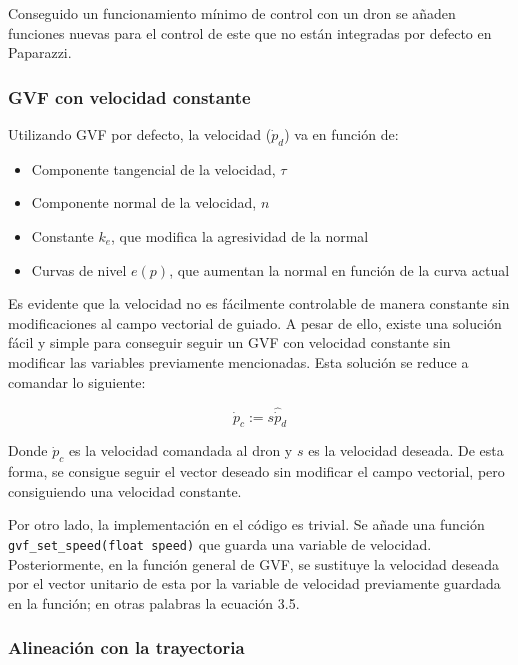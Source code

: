 Conseguido un funcionamiento mínimo de control con un dron se añaden 
funciones nuevas para el control de este que no están integradas por defecto en Paparazzi.

\subsubsection{GVF con velocidad constante}

Utilizando GVF por defecto, la velocidad ($\dot p_d$) va en función de:

\begin{itemize}
    \item Componente tangencial de la velocidad, $\tau$

    \item Componente normal de la velocidad, $n$

    \item Constante $k_e$, que modifica la agresividad de la normal

    \item Curvas de nivel $e(p)$, que aumentan la normal en función de la curva actual
\end{itemize}

Es evidente que la velocidad no es fácilmente controlable de manera constante sin 
modificaciones al campo vectorial de guiado.
A pesar de ello, existe una solución fácil y simple para conseguir seguir un GVF con
velocidad constante sin modificar las variables previamente mencionadas.
Esta solución se reduce a comandar lo siguiente:

\begin{equation} \label{eq: Constante_GVF_Speed}
    \dot p_c := s \hat{\dot{p}}_d
\end{equation}

Donde $\dot p_c$ es la velocidad comandada al dron y $s$ es la velocidad deseada.
De esta forma, se consigue seguir el vector deseado sin modificar el campo vectorial, 
pero consiguiendo una velocidad constante.

Por otro lado, la implementación en el código es trivial. 
Se añade una función \texttt{gvf\_set\_speed(float speed)} que guarda una variable de velocidad.
Posteriormente, en la función general de GVF, 
se sustituye la velocidad deseada por el vector unitario de esta por 
la variable de velocidad previamente guardada en la función; 
en otras palabras la ecuación 3.5.

\subsubsection{Alineación con la trayectoria}

